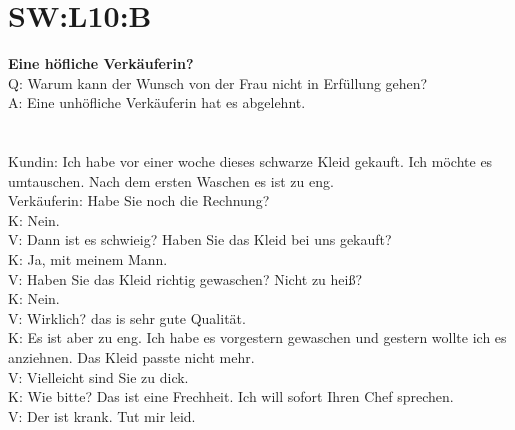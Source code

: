 \section{SW:L10:B}
\noindent
\textbf{Eine höfliche Verkäuferin?} \\
Q: Warum kann der Wunsch von der Frau nicht in Erfüllung gehen?  \\
A: Eine unhöfliche Verkäuferin hat es abgelehnt.  \\
\\
\\
\noindent
Kundin: Ich habe vor einer woche dieses schwarze Kleid gekauft. Ich möchte es umtauschen. Nach dem ersten Waschen es ist zu eng.  \\
Verkäuferin: Habe Sie noch die Rechnung? \\
K: Nein. \\
V: Dann ist es schwieig?  Haben Sie das Kleid bei uns gekauft? \\
K: Ja, mit meinem Mann. \\
V: Haben Sie das Kleid richtig gewaschen? Nicht zu heiß? \\
K: Nein. \\
V: Wirklich? das is sehr gute Qualität. \\
K: Es ist aber zu eng. Ich habe es vorgestern gewaschen und gestern wollte ich es anziehnen. Das Kleid passte nicht mehr.  \\
V: Vielleicht sind Sie zu dick. \\
K: Wie bitte? Das ist eine Frechheit.  Ich will sofort Ihren Chef sprechen. \\
V: Der ist krank. Tut mir leid. \\

